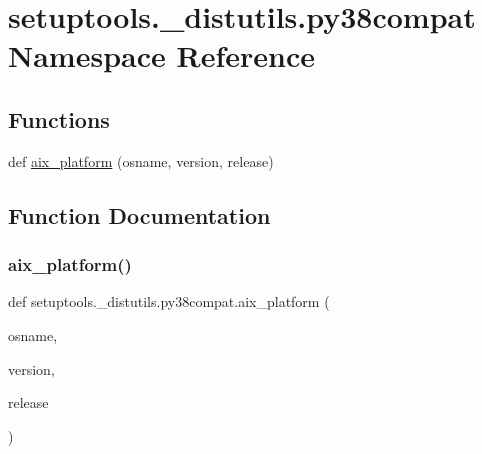 \hypertarget{namespacesetuptools_1_1__distutils_1_1py38compat}{}\section{setuptools.\+\_\+distutils.\+py38compat Namespace Reference}
\label{namespacesetuptools_1_1__distutils_1_1py38compat}
\subsection*{Functions}
\begin{DoxyCompactItemize}
\item 
def \hyperlink{namespacesetuptools_1_1__distutils_1_1py38compat_a9180a981759bbf817d8a0890557e9baf}{aix\+\_\+platform} (osname, version, release)
\end{DoxyCompactItemize}


\subsection{Function Documentation}
\mbox{\label{namespacesetuptools_1_1__distutils_1_1py38compat_a9180a981759bbf817d8a0890557e9baf}} 
\subsubsection{\texorpdfstring{aix\+\_\+platform()}{aix\_platform()}}
{\footnotesize\ttfamily def setuptools.\+\_\+distutils.\+py38compat.\+aix\+\_\+platform (\begin{DoxyParamCaption}\item[{}]{osname,  }\item[{}]{version,  }\item[{}]{release }\end{DoxyParamCaption})}

